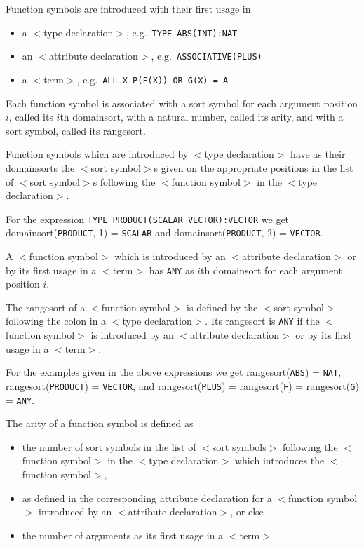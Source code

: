 Function symbols are introduced with their first usage in 
\begin{itemize}
\item a $<$type declaration$>$, e.g.\ {\tt TYPE ABS(INT):NAT}
\item an $<$attribute declaration$>$, e.g.\ {\tt ASSOCIATIVE(PLUS)}
\item a $<$term$>$, e.g.\  {\tt ALL X P(F(X)) OR G(X) = A}
\end{itemize}

Each function symbol is associated with a sort symbol for each argument 
position $i$, called its $i$th domainsort, with a natural number, called its 
arity, and with a sort symbol, called its rangesort. 

Function symbols which are introduced by $<$type declaration$>$ have as their 
domainsorts the $<$sort symbol$>$s given on the appropriate positions in the 
list of $<$sort symbol$>$s following the $<$function symbol$>$ in the $<$type 
declaration$>$.

\Ex

For the expression {\tt TYPE PRODUCT(SCALAR VECTOR):VECTOR} we get 
domainsort({\tt PRODUCT}, 1) = {\tt SCALAR} and domainsort({\tt PRODUCT},
2) = {\tt VECTOR}. 

A $<$function symbol$>$ which is introduced by an $<$attribute
declaration$>$ or by its first usage in a $<$term$>$ has {\tt ANY} as
$i$th domainsort for each argument position $i$.

The
rangesort of a $<$function symbol$>$ is defined by the $<$sort
symbol$>$ following the colon in a $<$type declaration$>$. Its
rangesort is {\tt ANY} if the $<$function symbol$>$ is introduced by
an $<$attribute declaration$>$ or by its first usage in a $<$term$>$.

\Ex

For the examples given in the above expressions we get 
rangesort({\tt ABS}) = {\tt NAT},
rangesort({\tt PRODUCT}) = {\tt VECTOR}, and 
rangesort({\tt PLUS}) = rangesort({\tt F}) = rangesort({\tt G}) = {\tt ANY}.

The arity of a function symbol is defined as 
\begin{itemize}
\item the number of sort symbols in the list of $<$sort symbols$>$ 
following the 
$<$function symbol$>$ in the $<$type declaration$>$ which introduces the 
$<$function symbol$>$,
\item as defined in the corresponding attribute declaration for a $<$function symbol$>$ introduced by an $<$attribute 
declaration$>$, or else
\item the number of arguments as its first usage in a $<$term$>$.
\end{itemize}

